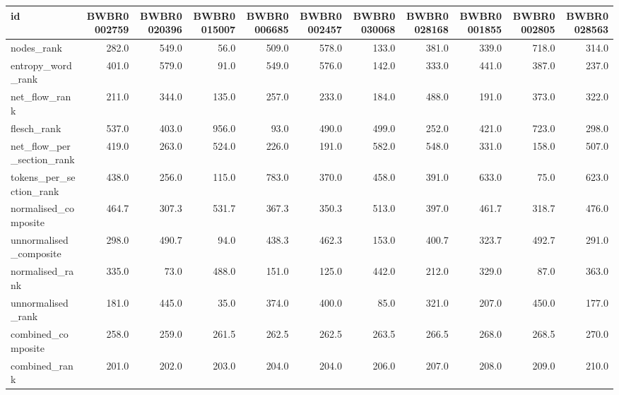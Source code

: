 \begin{tabular}{lrrrrrrrrrr}
\toprule
id & BWBR0002759 & BWBR0020396 & BWBR0015007 & BWBR0006685 & BWBR0002457 & BWBR0030068 & BWBR0028168 & BWBR0001855 & BWBR0002805 & BWBR0028563 \\
\midrule
nodes\_rank & 282.0 & 549.0 & 56.0 & 509.0 & 578.0 & 133.0 & 381.0 & 339.0 & 718.0 & 314.0 \\
\cline{1-11}
entropy\_word\_rank & 401.0 & 579.0 & 91.0 & 549.0 & 576.0 & 142.0 & 333.0 & 441.0 & 387.0 & 237.0 \\
\cline{1-11}
net\_flow\_rank & 211.0 & 344.0 & 135.0 & 257.0 & 233.0 & 184.0 & 488.0 & 191.0 & 373.0 & 322.0 \\
\cline{1-11}
flesch\_rank & 537.0 & 403.0 & 956.0 & 93.0 & 490.0 & 499.0 & 252.0 & 421.0 & 723.0 & 298.0 \\
\cline{1-11}
net\_flow\_per\_section\_rank & 419.0 & 263.0 & 524.0 & 226.0 & 191.0 & 582.0 & 548.0 & 331.0 & 158.0 & 507.0 \\
\cline{1-11}
tokens\_per\_section\_rank & 438.0 & 256.0 & 115.0 & 783.0 & 370.0 & 458.0 & 391.0 & 633.0 & 75.0 & 623.0 \\
\cline{1-11}
normalised\_composite & 464.7 & 307.3 & 531.7 & 367.3 & 350.3 & 513.0 & 397.0 & 461.7 & 318.7 & 476.0 \\
\cline{1-11}
unnormalised\_composite & 298.0 & 490.7 & 94.0 & 438.3 & 462.3 & 153.0 & 400.7 & 323.7 & 492.7 & 291.0 \\
\cline{1-11}
normalised\_rank & 335.0 & 73.0 & 488.0 & 151.0 & 125.0 & 442.0 & 212.0 & 329.0 & 87.0 & 363.0 \\
\cline{1-11}
unnormalised\_rank & 181.0 & 445.0 & 35.0 & 374.0 & 400.0 & 85.0 & 321.0 & 207.0 & 450.0 & 177.0 \\
\cline{1-11}
combined\_composite & 258.0 & 259.0 & 261.5 & 262.5 & 262.5 & 263.5 & 266.5 & 268.0 & 268.5 & 270.0 \\
\cline{1-11}
combined\_rank & 201.0 & 202.0 & 203.0 & 204.0 & 204.0 & 206.0 & 207.0 & 208.0 & 209.0 & 210.0 \\
\cline{1-11}
\bottomrule
\end{tabular}
